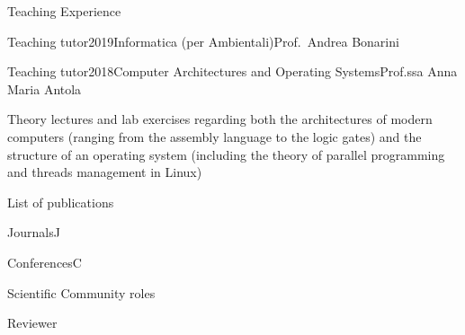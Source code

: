 \documentclass[
	a4paper, %
	11pt, %
]{resume} %
\newif\ifpublic{}
\begin{document}
\begin{rSection}{Teaching Experience}
\begin{rSubsection}{Teaching tutor}{2019}{Informatica (per Ambientali)}{Prof.\ Andrea Bonarini}
\end{rSubsection}
\begin{rSubsection}{Teaching tutor}{2018}{Computer Architectures and Operating Systems}{Prof.ssa Anna Maria Antola}
\item Theory lectures and lab exercises regarding both the architectures of
  modern computers (ranging from the assembly language to the logic gates) and
  the structure of an operating system (including the theory of parallel
  programming and threads management in Linux)
\end{rSubsection}
\end{rSection}
\clearpage
\begin{rSection}{List of publications}
  \begin{tSubPublications}{Journals}{J}
  \item {}
  \end{tSubPublications}
  \begin{tSubPublications}{Conferences}{C}
  \item {}
  \item {}
  \end{tSubPublications}
\end{rSection}
\begin{rSection}{Scientific Community roles}
  \begin{rSubsection}{Reviewer}{}{}{}
  \item {}
  \item {}
  \item {}
  \end{rSubsection}
\end{rSection}

\vfill
\ifpublic{%
    
    
  }
\fi
\end{document}
